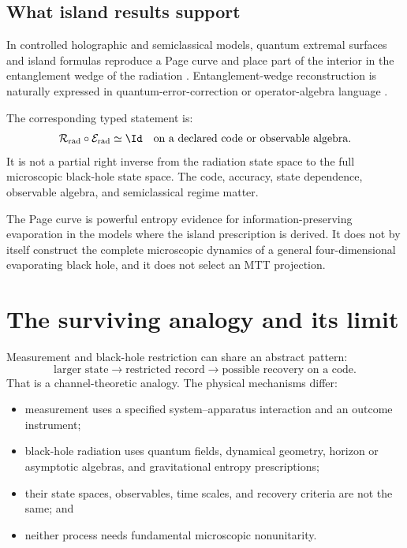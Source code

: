\documentclass[11pt]{article}
\newcommand{\E}{\mathcal E}
\newcommand{\R}{\mathcal R}
\begin{document}
\subsection{What island results support}

In controlled holographic and semiclassical models, quantum extremal surfaces
and island formulas reproduce a Page curve and place part of the interior in
the entanglement wedge of the radiation
\cite{Penington2019,AlmheiriMahajanMaldacenaZhao2019}. Entanglement-wedge
reconstruction is naturally expressed in quantum-error-correction or
operator-algebra language \cite{AlmheiriDongHarlow2015,DongHarlowWall2016}.

The corresponding typed statement is:
\[
 \R_{\mathrm{rad}}\circ\E_{\mathrm{rad}}
 \simeq \Id
 \quad\text{on a declared code or observable algebra}.
\]
It is not a partial right inverse from the radiation state space to the full
microscopic black-hole state space. The code, accuracy, state dependence,
observable algebra, and semiclassical regime matter.

The Page curve is powerful entropy evidence for information-preserving
evaporation in the models where the island prescription is derived. It does
not by itself construct the complete microscopic dynamics of a general
four-dimensional evaporating black hole, and it does not select an MTT
projection.

\section{The surviving analogy and its limit}

Measurement and black-hole restriction can share an abstract pattern:
\[
 \text{larger state}
 \longrightarrow
 \text{restricted record}
 \longrightarrow
 \text{possible recovery on a code}.
\]
That is a channel-theoretic analogy. The physical mechanisms differ:
\begin{itemize}
\item measurement uses a specified system--apparatus interaction and an
outcome instrument;
\item black-hole radiation uses quantum fields, dynamical geometry, horizon
or asymptotic algebras, and gravitational entropy prescriptions;
\item their state spaces, observables, time scales, and recovery criteria are
not the same; and
\item neither process needs fundamental microscopic nonunitarity.
\end{itemize}
\end{document}
